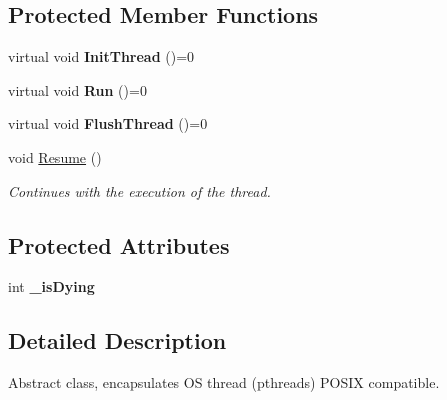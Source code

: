 \subsection*{Protected Member Functions}
\begin{DoxyCompactItemize}
\item 
\hypertarget{class_common_1_1_active_object_a9bc8d910184b23b25df7ac6dffa7e6e3}{virtual void {\bfseries Init\-Thread} ()=0}\label{class_common_1_1_active_object_a9bc8d910184b23b25df7ac6dffa7e6e3}

\item 
\hypertarget{class_common_1_1_active_object_aaaf7d59f7ca8efa8af210db47e3b56af}{virtual void {\bfseries Run} ()=0}\label{class_common_1_1_active_object_aaaf7d59f7ca8efa8af210db47e3b56af}

\item 
\hypertarget{class_common_1_1_active_object_af46d88184863861cdb921b2bac1ab458}{virtual void {\bfseries Flush\-Thread} ()=0}\label{class_common_1_1_active_object_af46d88184863861cdb921b2bac1ab458}

\item 
\hypertarget{class_common_1_1_active_object_a67a1764f49660a0d24c9b48671337f2d}{void \hyperlink{class_common_1_1_active_object_a67a1764f49660a0d24c9b48671337f2d}{Resume} ()}\label{class_common_1_1_active_object_a67a1764f49660a0d24c9b48671337f2d}

\begin{DoxyCompactList}\small\item\em Continues with the execution of the thread. \end{DoxyCompactList}\end{DoxyCompactItemize}
\subsection*{Protected Attributes}
\begin{DoxyCompactItemize}
\item 
\hypertarget{class_common_1_1_active_object_a8a1af686cb9455bd5fae334ff7e3e3cc}{int {\bfseries \-\_\-is\-Dying}}\label{class_common_1_1_active_object_a8a1af686cb9455bd5fae334ff7e3e3cc}

\end{DoxyCompactItemize}


\subsection{Detailed Description}
Abstract class, encapsulates O\-S thread (pthreads) P\-O\-S\-I\-X compatible. 


